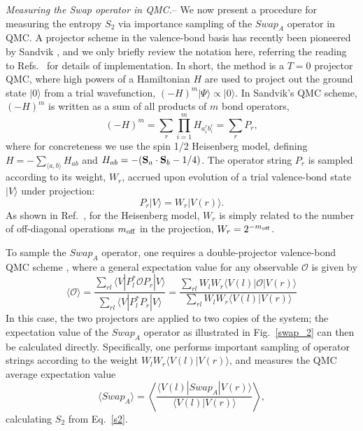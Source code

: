 \documentclass[prl,aps,twocolumn,floatfix,amsmath,amssymb,superscriptaddress,tightenlines]{revtex4}
\begin{document}
{\it Measuring the Swap operator in QMC.}--
We now present a procedure for measuring the entropy $S_2$ via importance sampling of the $Swap_A$ operator in QMC.  A
projector scheme in the valence-bond basis has recently been pioneered by Sandvik \cite{Sandvik}, and we only briefly
review the notation here, referring the reading to Refs.~\cite{Sandvik,Beach,AWSloop} for details of implementation.
In short, the method is a $T=0$ projector QMC, where high powers of
a Hamiltonian $H$ are used to project out the ground state $|0\rangle$ from a trial wavefunction, 
$(-H)^m|\Psi \rangle \propto |0\rangle$.  In Sandvik's QMC scheme, $(-H)^m$ is written as a sum of all products of $m$ bond
operators,
\begin{equation}
(-H)^m = \sum_r \prod_{i=1}^m H_{a_i^r b_i^r} = \sum_r P_r,
\end{equation}
where for concreteness we use the spin 1/2 Heisenberg model, defining $H=-\sum_{\langle a,b \rangle}H_{ab}$ and 
$H_{ab} = -({\bf S}_a \cdot {\bf S}_b - 1/4)$.  The operator string $P_r$ is sampled according to its weight, $W_r$, accrued upon
evolution of a trial valence-bond state $|V \rangle$ under projection:
\begin{equation}
P_r |V \rangle = W_r |V(r) \rangle.
\end{equation}
As shown in Ref.~\cite{Sandvik}, for the Heisenberg model, $W_r$ is simply related to the number of off-diagonal 
operations $m_{\rm off}$ in the projection, $W_r = 2^{-m_{\rm off}}$.

To sample the $Swap_A$ operator, one requires a double-projector valence-bond QMC scheme \cite{Sandvik}, where
a general expectation value for any observable $\mathcal{O}$ is given by
\begin{equation}
\label{expect}
\langle \mathcal{O} \rangle = \frac{\sum_{rl} \langle V | P_l^* \mathcal{O} P_r | V \rangle} {\sum_{rl} \langle V | P_l^* P_r | V \rangle} 
= \frac{\sum_{rl} W_l W_r \langle V(l) | \mathcal{O} | V(r) \rangle} {\sum_{rl} W_l W_r \langle V(l) | V(r) \rangle}
\end{equation} 
In this case, the two projectors are applied to two copies of the system; 
the expectation value of the $Swap_A$ operator as illustrated in Fig.~\ref{swap_2} 
can then be calculated directly.  Specifically, one 
performs important sampling of operator strings according to the weight $W_l W_r \langle V(l) | V(r) \rangle$, and measures
the QMC average expectation value
\begin{equation}
\langle Swap_A \rangle =  \left\langle{ \frac{ \langle V(l) | Swap_A | V(r) \rangle}{\langle V(l) | V(r) \rangle}  }\right\rangle,
\label{Swap}
\end{equation}
calculating $S_2$ from Eq.~\eqref{s2}.
\end{document}
